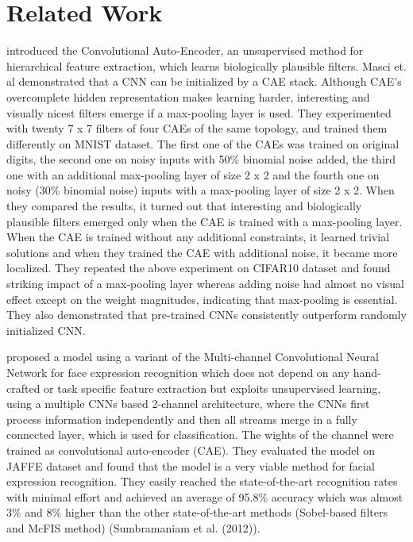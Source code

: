 \documentclass{article}
\begin{document}
\section{Related Work}
\cite{masci11} introduced the Convolutional Auto-Encoder, an unsupervised method for hierarchical feature extraction, which learns biologically plausible filters. Masci et. al demonstrated that a CNN can be initialized by a CAE stack. Although CAE’s overcomplete hidden representation makes learning harder,  interesting and visually nicest filters emerge if a max-pooling layer is used. They experimented with twenty 7 x 7 filters of four CAEs of the same topology, and trained them differently on MNIST dataset. The first one of the CAEs was trained on original digits, the second one on noisy inputs with 50\% binomial noise added, the third one with an additional max-pooling layer of size 2 x 2 and the fourth one on noisy (30\% binomial noise) inputs with a max-pooling layer of size 2 x 2. When they compared the results, it turned out that interesting and biologically plausible filters emerged only when the CAE is trained with a max-pooling layer. When the CAE is trained without any additional constraints, it learned trivial solutions and when they trained the CAE with additional noise, it became more localized. They repeated the above experiment on CIFAR10 dataset and found striking impact of a max-pooling layer whereas adding noise had almost no visual effect except on the weight magnitudes, indicating that max-pooling is essential. They also demonstrated that pre-trained CNNs consistently outperform randomly initialized CNN.

\cite{hamester15} proposed a model using a variant of the Multi-channel Convolutional Neural Network for face expression recognition which does not depend on any hand-crafted or task specific feature extraction but exploits unsupervised learning, using a multiple CNNs based 2-channel architecture, where the CNNs first process information independently and then all streams merge in a fully connected layer, which is used for classification. The wights of the channel were trained as convolutional auto-encoder (CAE). They evaluated the model on JAFFE dataset and found that the model is a very viable method for facial expression recognition. They easily reached the state-of-the-art recognition rates with minimal effort and achieved an average of 95.8\% accuracy which was almost 3\% and 8\% higher than the other state-of-the-art methods (Sobel-based filters and McFIS method) (Sumbramaniam et al. (2012)).
\end{document}
